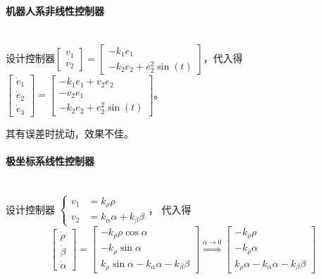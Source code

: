 \documentclass[
12pt, %
a4paper, 
oneside, %
headinclude,footinclude, %
]{scrartcl}
\begin{document}
\paragraph{机器人系非线性控制器}~\\

设计控制器$ \begin{bmatrix} v_1 \\ v_2 \end{bmatrix} = \begin{bmatrix} -k_1 e_1 \\ -k_2 e_2 + e_2^2 \sin(t) \end{bmatrix} $，代入得$ \begin{bmatrix} \dot{e}_1 \\ \dot{e}_2 \\ \dot{e}_3 \end{bmatrix} = \begin{bmatrix} -k_1 e_1 + v_2 e_2 \\ -v_2 e_1 \\ -k_2 e_2 + e_2^2 \sin(t) \end{bmatrix} $。

其有误差时扰动，效果不佳。
\paragraph{极坐标系线性控制器}~\\

设计控制器
$ 
\begin{cases}
v_1 &= k_\rho \rho \\
v_2 &= k_\alpha \alpha + k_\beta \beta
\end{cases}
$，
代入得
$$
\begin{bmatrix} \dot{\rho} \\ \dot{\beta} \\ \dot{\alpha} \end{bmatrix} = \begin{bmatrix} -k_\rho \rho \cos\alpha \\ -k_\rho \sin\alpha \\ k_\rho \sin\alpha - k_\alpha \alpha - k_\beta \beta \end{bmatrix}
\overset{\alpha \to 0}{\Longrightarrow}
\begin{bmatrix} -k_\rho \rho \\ -k_\rho \alpha \\ k_\rho \alpha - k_\alpha \alpha - k_\beta \beta \end{bmatrix}
$$
\end{document}
